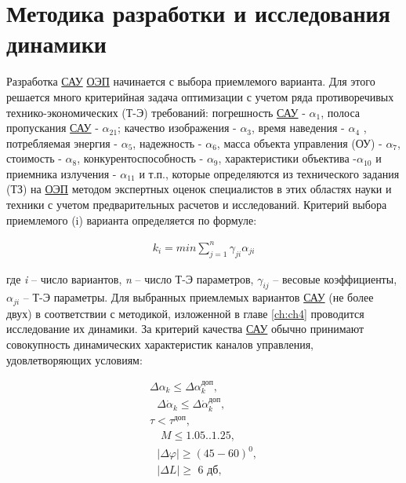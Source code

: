 \section{Методика разработки и исследования динамики} \label{sec:ch2/sec1-}


Разработка \hyperref[acroSAU]{САУ} \hyperref[acroEOS]{ОЭП} начинается с выбора приемлемого варианта. Для этого решается много критерийная задача оптимизации с учетом ряда противоречивых технико-экономических (Т-Э) требований: погрешность \hyperref[acroSAU]{САУ} - $\alpha_{1}$, полоса пропускания \hyperref[acroSAU]{САУ} - $\alpha_{21}$; качество изображения - $\alpha_{3}$, время наведения - $\alpha_{4}$ , потребляемая энергия - $\alpha_{5}$, надежность - $\alpha_{6}$, масса объекта управления (ОУ) - $\alpha_{7}$, стоимость - $\alpha_{8}$, конкурентоспособность - $\alpha_{9}$, характеристики объектива -$\alpha_{10}$ и приемника излучения - $\alpha_{11}$ и т.п., которые определяются из технического задания (ТЗ) на \hyperref[acroEOS]{ОЭП} методом экспертных оценок специалистов в этих областях науки и техники с учетом предварительных расчетов и исследований. Критерий выбора приемлемого (i) варианта определяется по формуле:

\begin{equation}
\label{eq:p2:1}
\begin{alignedat}{2}
k_i=min\sum_{j=1}^n{\gamma _{ji}\alpha _{ji}}
\end{alignedat}
\end{equation}

где \textit{i} – число вариантов, \textit{n} – число Т-Э параметров, $\gamma_{ij}$ – весовые коэффициенты, $\alpha_{ji}$ – Т-Э параметры. Для выбранных приемлемых вариантов \hyperref[acroSAU]{САУ} (не более двух) в соответствии с методикой, изложенной в главе \ref{ch:ch4} проводится исследование их динамики. За критерий качества \hyperref[acroSAU]{САУ} обычно принимают совокупность динамических характеристик каналов управления, удовлетворяющих условиям:

\begin{equation}
\label{eq:p2:2}
\begin{alignedat}{2}
\varDelta \alpha _k\leqslant \varDelta \alpha _{k}^{\textit{доп}},
\\
\,\,\,\,\varDelta \dot{\alpha}_k\leqslant \varDelta \dot{\alpha}_{k}^{\textit{доп}},
\\
\tau < \tau^\textit{доп},
\\
\,\,\,\,\,\,M\leqslant \text{1.05..1.25,}
\\
\,\,\,\,\left| \left. \varDelta \varphi \right| \right. \geqslant \left( 45-60 \right) ^0,
\\
\,\,\,\,\left| \left. \varDelta L \right|\geqslant \,\,\textit{6 дб}, \right. 
\end{alignedat}
\end{equation}

